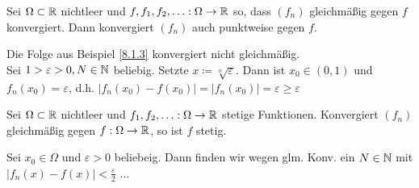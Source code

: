 \begin{sublemma}
	Sei $ \Omega \subset \mathbb{R}  $ nichtleer und $ f, f_1, f_2, \dotsc : \Omega \to \mathbb{R}  $ so, dass $ (f_n) $ gleichmäßig gegen $ f $ konvergiert.
	Dann konvergiert $ (f_n) $ auch punktweise gegen $ f $.
\end{sublemma}

\begin{subexample}
	Die Folge aus Beispiel \ref{8.1.3} konvergiert nicht gleichmäßig.\\
	Sei $ 1 > \varepsilon > 0, N \in \mathbb{N}  $ beliebig. Setzte $ x \coloneqq \sqrt[n]{\varepsilon }   $. Dann ist $ x_0 \in (0, 1) $ und $ f_n(x_0) = \varepsilon  $, d.h. $ |f_n(x_0) - f(x_0)| = |f_n(x_0)| = \varepsilon \geq \varepsilon  $
\end{subexample}

\begin{subtheorem}
	Sei $ \Omega \subset \mathbb{R}  $ nichtleer und $ f_1, f_2, \dotsc : \Omega \to \mathbb{R}  $ stetige Funktionen.
	Konvergiert $ (f_n) $ gleichmäßig gegen $ f: \Omega \to \mathbb{R}  $, so ist $ f $ stetig.
\end{subtheorem}

\begin{subproof*}
	Sei $ x_0 \in \Omega $ und $ \varepsilon > 0 $ beliebeig. Dann finden wir wegen glm. Konv. ein $ N \in \mathbb{N} $
	mit $ |f_n(x) - f(x)| < \frac{ \varepsilon  }{ 2 }  $ ...
\end{subproof*}


